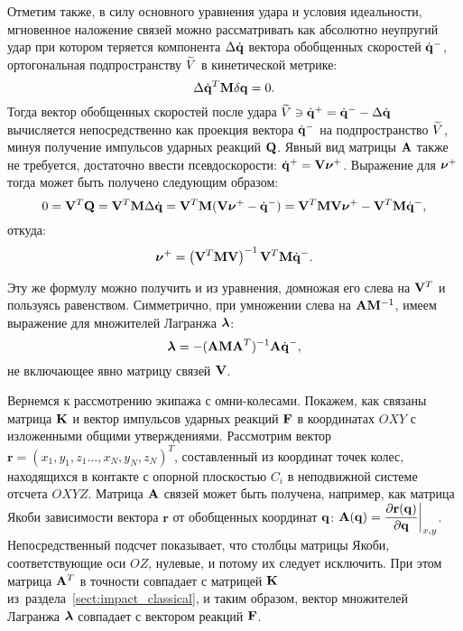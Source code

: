 Отметим также, в силу основного уравнения удара и условия идеальности, мгновенное наложение связей можно рассматривать как абсолютно неупругий удар при котором теряется компонента $\Delta\dot{\mathbf{q}}$ вектора обобщенных скоростей $\dot{\mathbf{q}}^-$, ортогональная подпространству $\widetilde{V}$ в кинетической метрике:
\begin{equation*}
    \Delta\dot{\mathbf{q}}^T\mathbf{M}\delta\mathbf{q} = 0.
\end{equation*}
Тогда вектор обобщенных скоростей после удара $\widetilde{V} \ni \dot{\mathbf{q}}^+ = \dot{\mathbf{q}}^- - \Delta\dot{\mathbf{q}}$ вычисляется непосредственно как проекция вектора $\dot{\mathbf{q}}^-$ на подпространство $\widetilde{V}$, минуя получение импульсов ударных реакций $\mathbf{Q}$. Явный вид матрицы $\mathbf{A}$ также не требуется, достаточно ввести псевдоскорости: $\dot{\mathbf{q}}^+ = \mathbf{V}\boldsymbol{\mathbf{\nu}}^+$.
Выражение для $\boldsymbol{\mathbf{\nu}}^+$ тогда может быть получено следующим образом:
\begin{equation*}
    0 = \mathbf{V}^T\mathbf{Q} = \mathbf{V}^T\mathbf{M}\Delta\dot{\mathbf{q}} = \mathbf{V}^T\mathbf{M}(\mathbf{V}\boldsymbol{\mathbf{\nu}}^+ - \dot{\mathbf{q}}^-) = \mathbf{V}^T\mathbf{M}\mathbf{V}\boldsymbol{\mathbf{\nu}}^+ - \mathbf{V}^T\mathbf{M}\dot{\mathbf{q}}^-,
\end{equation*}
откуда:
\begin{equation*}
\boldsymbol{\mathbf{\nu}}^+ = \left( \mathbf{V}^T\mathbf{M}\mathbf{V} \right)^{-1}\mathbf{V}^T\mathbf{M}\dot{\mathbf{q}}^-.
\end{equation*}

Эту же формулу можно получить и из уравнения, домножая его слева на $\mathbf{V}^T$ и пользуясь равенством. Симметрично, при умножении слева на $\mathbf{A}\mathbf{M}^{-1}$, имеем выражение для множителей Лагранжа $\boldsymbol{\mathbf{\lambda}}$:
\begin{equation*}
    \boldsymbol{\mathbf{\lambda}} = -(\mathbf{A} \mathbf{M} \mathbf{A}^T)^{-1}\mathbf{A}\dot{\mathbf{q}}^-,
\end{equation*}
не включающее явно матрицу связей $\mathbf{V}$.

Вернемся к рассмотрению экипажа с омни-колесами. Покажем, как связаны матрица $\mathbf{K}$ и вектор импульсов ударных реакций $\mathbf{F}$ в координатах $OXY$ с изложенными общими утверждениями.
Рассмотрим вектор $\mathbf{r} = ( x_1, y_1, z_1 \ldots, x_N, y_N, z_N )^T$, составленный из координат точек колес, находящихся в контакте с опорной плоскостью $C_i$ в неподвижной системе отсчета $OXYZ$.
Матрица $\mathbf{A}$ связей может быть получена, например, как матрица Якоби зависимости вектора $\mathbf{r}$ от обобщенных координат $\mathbf{q}$: $\mathbf{A}(\mathbf{q}) = \displaystyle\frac{\displaystyle \partial \mathbf{r}(\mathbf{q})}{\displaystyle \partial \mathbf{q}}\bigg|_{x,y}$.
Непосредственный подсчет показывает, что столбцы матрицы Якоби, соответствующие оси $OZ$, нулевые, и потому их следует исключить.
При этом матрица $\mathbf{A}^T$ в точности совпадает с матрицей $\mathbf{K}$ из~раздела~\ref{sect:impact_classical}, и таким образом, вектор множителей Лагранжа $\boldsymbol{\mathbf{\lambda}}$ совпадает с вектором реакций $\mathbf{F}$.

